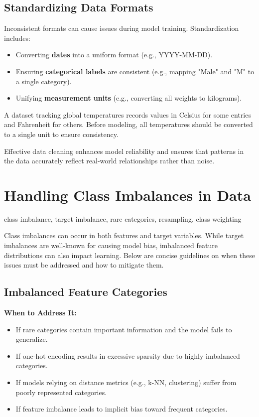\documentclass[12pt,openany, draft]{book}
\begin{document}
\subsection{Standardizing Data Formats}
Inconsistent formats can cause issues during model training. Standardization includes:

\begin{itemize}
    \item Converting \textbf{dates} into a uniform format (e.g., YYYY-MM-DD).
    \item Ensuring \textbf{categorical labels} are consistent (e.g., mapping "Male" and "M" to a single category).
    \item Unifying \textbf{measurement units} (e.g., converting all weights to kilograms).
\end{itemize}

\begin{examplebox}
A dataset tracking global temperatures records values in Celsius for some entries and Fahrenheit for others. Before modeling, all temperatures should be converted to a single unit to ensure consistency.
\end{examplebox}

Effective data cleaning enhances model reliability and ensures that patterns in the data accurately reflect real-world relationships rather than noise. \newline



\section{Handling Class Imbalances in Data}

\begin{keywordsbox}
class imbalance, target imbalance, rare categories, resampling, class weighting
\end{keywordsbox}


Class imbalances can occur in both features and target variables. While target imbalances are well-known for causing model bias, imbalanced feature distributions can also impact learning. Below are concise guidelines on when these issues must be addressed and how to mitigate them.

\subsection{Imbalanced Feature Categories}

\textbf{When to Address It:}
\begin{itemize}
    \item If rare categories contain important information and the model fails to generalize.
    \item If one-hot encoding results in excessive sparsity due to highly imbalanced categories.
    \item If models relying on distance metrics (e.g., k-NN, clustering) suffer from poorly represented categories.
    \item If feature imbalance leads to implicit bias toward frequent categories.
\end{itemize}
\end{document}
